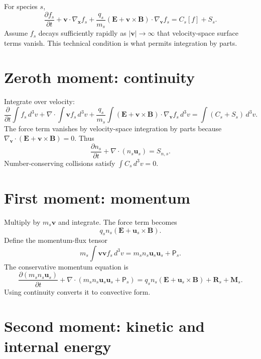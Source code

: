 \documentclass[11pt]{article}
\begin{document}
For species $s$,
\begin{equation}
\frac{\partial f_s}{\partial t}
+\mathbf v\cdot\nabla_{\mathbf x}f_s
+\frac{q_s}{m_s}(\mathbf E+\mathbf v\times\mathbf B)
\cdot\nabla_{\mathbf v}f_s
=C_s[f]+S_s.
\end{equation}
Assume $f_s$ decays sufficiently rapidly as $|\mathbf v|\to\infty$ that velocity-space surface terms vanish. This technical condition is what permits integration by parts.


\section{Zeroth moment: continuity}

Integrate over velocity:
\begin{equation}
\frac{\partial}{\partial t}\int f_s\,d^3v
+\nabla\cdot\int\mathbf v f_s\,d^3v
+\frac{q_s}{m_s}\int(\mathbf E+\mathbf v\times\mathbf B)\cdot\nabla_{\mathbf v}f_s\,d^3v
=\int(C_s+S_s)\,d^3v.
\end{equation}
The force term vanishes by velocity-space integration by parts because $\nabla_{\mathbf v}\cdot(\mathbf E+\mathbf v\times\mathbf B)=0$. Thus
\begin{equation}
\boxed{\frac{\partial n_s}{\partial t}+\nabla\cdot(n_s\mathbf u_s)=S_{n,s}}.
\end{equation}
Number-conserving collisions satisfy $\int C_s\,d^3v=0$.


\section{First moment: momentum}

Multiply by $m_s\mathbf v$ and integrate. The force term becomes
\begin{equation}
q_sn_s(\mathbf E+\mathbf u_s\times\mathbf B).
\end{equation}
Define the momentum-flux tensor
\begin{equation}
m_s\int\mathbf v\mathbf v f_s\,d^3v
=m_sn_s\mathbf u_s\mathbf u_s+\mathsf P_s.
\end{equation}
The conservative momentum equation is
\begin{equation}
\frac{\partial(m_sn_s\mathbf u_s)}{\partial t}
+\nabla\cdot(m_sn_s\mathbf u_s\mathbf u_s+\mathsf P_s)
=q_sn_s(\mathbf E+\mathbf u_s\times\mathbf B)+\mathbf R_s+\mathbf M_s.
\end{equation}
Using continuity converts it to convective form.


\section{Second moment: kinetic and internal energy}
\end{document}
